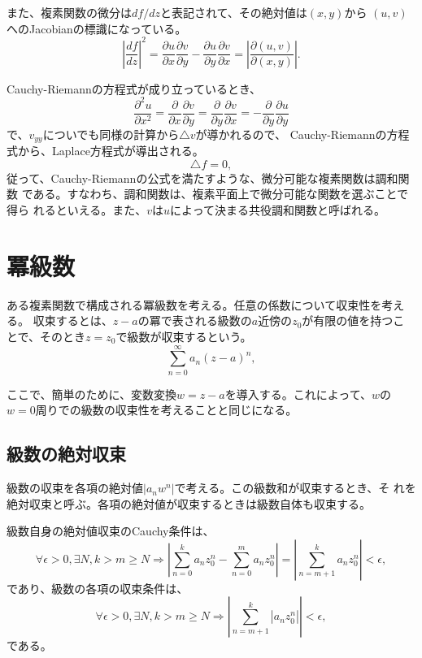 また、複素関数の微分は$df/dz$と表記されて、その絶対値は$(x,y)$から
$(u,v)$へのJacobianの標識になっている。
\begin{equation}
 \left|\frac{df}{dz}\right|^2 
  = \frac{\partial u}{\partial x}\frac{\partial v}{\partial y}
  - \frac{\partial u}{\partial y}\frac{\partial v}{\partial x}
  =\left|\frac{\partial (u,v)}{\partial (x,y)}\right|.
\end{equation}

Cauchy-Riemannの方程式が成り立っているとき、
\[
 \frac{\partial^2u}{\partial x^2}  
 = \frac{\partial}{\partial x}\frac{\partial v}{\partial y}
 = \frac{\partial}{\partial y}\frac{\partial v}{\partial x}
 = -\frac{\partial}{\partial y}\frac{\partial u}{\partial y}
\]
で、$v_{yy}$についでも同様の計算から$\triangle v$が導かれるので、
Cauchy-Riemannの方程式から、Laplace方程式が導出される。
\begin{equation}
 \triangle f = 0,
\end{equation}
従って、Cauchy-Riemannの公式を満たすような、微分可能な複素関数は調和関数
である。すなわち、調和関数は、複素平面上で微分可能な関数を選ぶことで得ら
れるといえる。また、$v$は$u$によって決まる共役調和関数と呼ばれる。

\section{冪級数}
ある複素関数で構成される冪級数を考える。任意の係数について収束性を考える。
収束するとは、$z-a$の冪で表される級数の$a$近傍の$z_0$が有限の値を持つこ
とで、そのとき$z=z_0$で級数が収束するという。
\begin{equation}
 \sum_{n=0}^{\infty}a_n(z-a)^n,
\end{equation}

ここで、簡単のために、変数変換$w=z-a$を導入する。これによって、$w$の
$w=0$周りでの級数の収束性を考えることと同じになる。

\subsection{級数の絶対収束}
級数の収束を各項の絶対値$|a_nw^n|$で考える。この級数和が収束するとき、そ
れを絶対収束と呼ぶ。各項の絶対値が収束するときは級数自体も収束する。

級数自身の絶対値収束のCauchy条件は、
\begin{equation}
 \forall\epsilon >0, \exists N, k>m\geq N
  \Rightarrow \left|\sum_{n=0}^k a_nz_0^n - \sum_{n=0}^m a_nz_0^n\right| 
  = \left|\sum_{n=m+1}^{k} a_nz_0^n\right|
  <\epsilon,
\end{equation}
であり、級数の各項の収束条件は、
\begin{equation}
  \forall\epsilon >0, \exists N, k>m\geq N
  \Rightarrow \left|\sum_{n=m+1}^{k} \left|a_nz_0^n\right|\right|
  <\epsilon,
\end{equation}
である。

